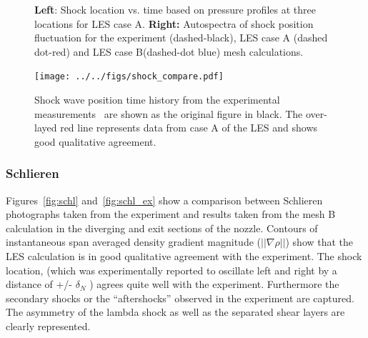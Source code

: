 \documentclass[]{aiaa-tc}%
\begin{document}


\begin{figure}[!h]%
	\centering
 	\caption{ {\bf Left}: Shock location vs. time based on pressure profiles at three locations for LES case A. {\bf Right:} Autospectra of shock position fluctuation for the experiment (dashed-black), LES case A (dashed dot-red) and LES case B(dashed-dot blue) mesh calculations. }
 	
\end{figure}


\begin{figure}[!h]
	\begin{centering}
	\texttt{[image: ../../figs/shock\_compare.pdf]}
	\caption{ Shock wave position time history from the experimental measurements~\cite{Papam:10} are shown as the original figure in black.  The over-layed red line represents data from case A of the LES and shows good qualitative agreement.
 	\label{fig:shock_compare}
	}
	\end{centering}
\end{figure}



\subsubsection{Schlieren}


Figures~\ref{fig:schl} and~\ref{fig:schl_ex} show a comparison between Schlieren photographs taken from the experiment and results taken from the mesh B calculation in the diverging and exit sections of the nozzle.  Contours of instantaneous span averaged density gradient magnitude ($||\nabla\rho|| $) show that the LES calculation is in good qualitative agreement with the experiment.  The shock location, (which was experimentally reported to oscillate left and right by a distance of +/- $\delta_N$ ) agrees quite well with the experiment.  Furthermore the secondary shocks or the ``aftershocks'' observed in the experiment are captured.  The asymmetry of the lambda shock as well as the separated shear layers are clearly represented.
\end{document}
